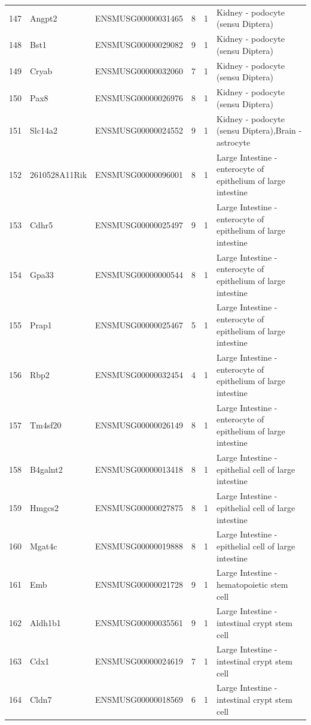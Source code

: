 \begin{table}[ht]
{\begin{tabular}{lllrrl}
        147 & Angpt2 & ENSMUSG00000031465 & 8 & 1 & Kidney - podocyte (sensu Diptera) \\
        148 & Bst1 & ENSMUSG00000029082 & 9 & 1 & Kidney - podocyte (sensu Diptera) \\
        149 & Cryab & ENSMUSG00000032060 & 7 & 1 & Kidney - podocyte (sensu Diptera) \\
        150 & Pax8 & ENSMUSG00000026976 & 8 & 1 & Kidney - podocyte (sensu Diptera) \\
        151 & Slc14a2 & ENSMUSG00000024552 & 9 & 1 & Kidney - podocyte (sensu Diptera),Brain - astrocyte \\
        152 & 2610528A11Rik & ENSMUSG00000096001 & 8 & 1 & Large Intestine - enterocyte of epithelium of large intestine \\
        153 & Cdhr5 & ENSMUSG00000025497 & 9 & 1 & Large Intestine - enterocyte of epithelium of large intestine \\
        154 & Gpa33 & ENSMUSG00000000544 & 8 & 1 & Large Intestine - enterocyte of epithelium of large intestine \\
        155 & Prap1 & ENSMUSG00000025467 & 5 & 1 & Large Intestine - enterocyte of epithelium of large intestine \\
        156 & Rbp2 & ENSMUSG00000032454 & 4 & 1 & Large Intestine - enterocyte of epithelium of large intestine \\
        157 & Tm4sf20 & ENSMUSG00000026149 & 8 & 1 & Large Intestine - enterocyte of epithelium of large intestine \\
        158 & B4galnt2 & ENSMUSG00000013418 & 8 & 1 & Large Intestine - epithelial cell of large intestine \\
        159 & Hmgcs2 & ENSMUSG00000027875 & 8 & 1 & Large Intestine - epithelial cell of large intestine \\
        160 & Mgat4c & ENSMUSG00000019888 & 8 & 1 & Large Intestine - epithelial cell of large intestine \\
        161 & Emb & ENSMUSG00000021728 & 9 & 1 & Large Intestine - hematopoietic stem cell \\
        162 & Aldh1b1 & ENSMUSG00000035561 & 9 & 1 & Large Intestine - intestinal crypt stem cell \\
        163 & Cdx1 & ENSMUSG00000024619 & 7 & 1 & Large Intestine - intestinal crypt stem cell \\
        164 & Cldn7 & ENSMUSG00000018569 & 6 & 1 & Large Intestine - intestinal crypt stem cell \\

\end{tabular}}
\end{table}
